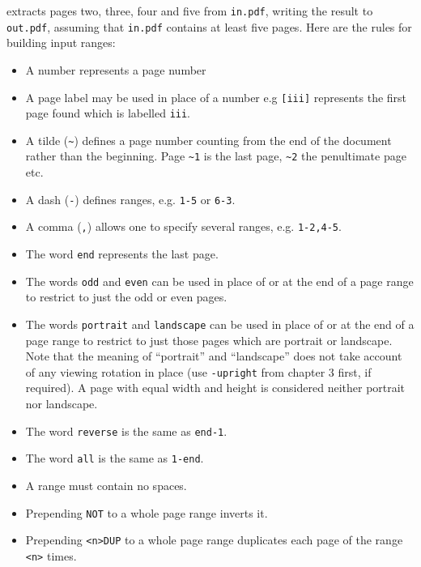 \documentclass{book}
\begin{document}
  \noindent extracts pages two, three, four and five from \texttt{in.pdf},
writing the result to \texttt{out.pdf}, assuming that \texttt{in.pdf} contains
at least five pages.
  Here are the rules for building input ranges:
  \begin{itemize}
    \item A number represents a page number
    \item A page label may be used in place of a number e.g \texttt{[iii]} represents the first page found which is labelled \texttt{iii}.
    \item A tilde (\texttt{\~{}}) defines a page number counting from the end of the document rather than the beginning. Page \texttt{\~{}1} is the last page, \texttt{\~{}2} the penultimate page etc.
    \item A dash (\texttt{-}) defines ranges, e.g. \texttt{1-5} or \texttt{6-3}.
    \item A comma (\texttt{,}) allows one to specify several ranges, e.g. \texttt{1-2,4-5}.
    \item The word \texttt{end} represents the last page.
    \item The words \texttt{odd} and \texttt{even} can be used in place of or at the end of a page range to restrict to just the odd or even pages.
    \item The words \texttt{portrait} and \texttt{landscape} can be used in place of or at the end of a page range to restrict to just those pages which are portrait or landscape. Note that the meaning of ``portrait'' and ``landscape'' does not take account of any viewing rotation in place (use \texttt{-upright} from chapter 3 first, if required). A page with equal width and height is considered neither portrait nor landscape.
    \item The word \texttt{reverse} is the same as \texttt{end-1}.
    \item The word \texttt{all} is the same as \texttt{1-end}.
    \item A range must contain no spaces.
    \item Prepending \texttt{NOT} to a whole page range inverts it. 
    \item Prepending \verb!<n>!\texttt{DUP} to a whole page range duplicates each page of the range \verb!<n>! times.
  \end{itemize}
 
\end{document}

